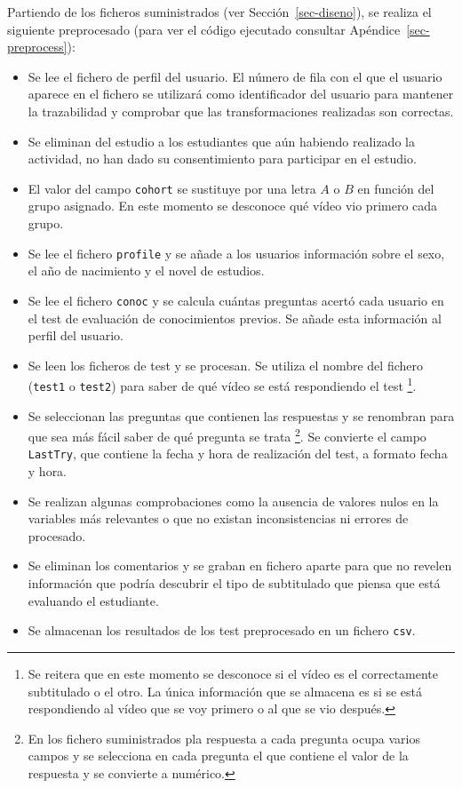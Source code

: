 \documentclass[
  12pt,
  a4paper,
  extrafontsizes,
  onecolumn,
  openright]{memoir}
\newlength{\rf}
\begin{document}
Partiendo de los ficheros suministrados (ver Sección~\ref{sec-diseno}),
se realiza el siguiente preprocesado (para ver el código ejecutado
consultar Apéndice~\ref{sec-preprocess}):

\begin{itemize}
\item
  Se lee el fichero de perfil del usuario. El número de fila con el que
  el usuario aparece en el fichero se utilizará como identificador del
  usuario para mantener la trazabilidad y comprobar que las
  transformaciones realizadas son correctas.
\item
  Se eliminan del estudio a los estudiantes que aún habiendo realizado
  la actividad, no han dado su consentimiento para participar en el
  estudio.
\item
  El valor del campo \texttt{cohort} se sustituye por una letra \(A\) o
  \(B\) en función del grupo asignado. En este momento se desconoce qué
  vídeo vio primero cada grupo.
\item
  Se lee el fichero \texttt{profile} y se añade a los usuarios
  información sobre el sexo, el año de nacimiento y el novel de
  estudios.
\item
  Se lee el fichero \texttt{conoc} y se calcula cuántas preguntas acertó
  cada usuario en el test de evaluación de conocimientos previos. Se
  añade esta información al perfil del usuario.
\item
  Se leen los ficheros de test y se procesan. Se utiliza el nombre del
  fichero (\texttt{test1} o \texttt{test2}) para saber de qué vídeo se
  está respondiendo el test \footnote{Se reitera que en este momento se
    desconoce si el vídeo es el correctamente subtitulado o el otro. La
    única información que se almacena es si se está respondiendo al
    vídeo que se voy primero o al que se vio después.}.
\item
  Se seleccionan las preguntas que contienen las respuestas y se
  renombran para que sea más fácil saber de qué pregunta se trata
  \footnote{En los fichero suministrados pla respuesta a cada pregunta
    ocupa varios campos y se selecciona en cada pregunta el que contiene
    el valor de la respuesta y se convierte a numérico.}. Se convierte
  el campo \texttt{LastTry}, que contiene la fecha y hora de realización
  del test, a formato fecha y hora.
\item
  Se realizan algunas comprobaciones como la ausencia de valores nulos
  en la variables más relevantes o que no existan inconsistencias ni
  errores de procesado.
\item
  Se eliminan los comentarios y se graban en fichero aparte para que no
  revelen información que podría descubrir el tipo de subtitulado que
  piensa que está evaluando el estudiante.
\item
  Se almacenan los resultados de los test preprocesado en un fichero
  \texttt{csv}.
\end{itemize}
\end{document}
